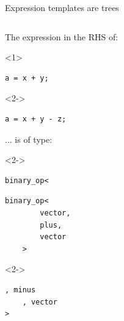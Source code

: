 \documentclass[@BEAMER_OPTIONS@]{beamer}
\begin{document}
\note{ }

\begin{frame}[fragile]{Expression templates are trees}
    \begin{columns}
        \begin{column}{0.4\textwidth}
            \begin{exampleblock}{The expression in the RHS of:}
                \begin{onlyenv}<1>
                    \begin{lstlisting}
a = x + y;
                    \end{lstlisting}
                \end{onlyenv}
                \begin{onlyenv}<2->
                    \begin{lstlisting}
a = x + y - z;
                    \end{lstlisting}
                \end{onlyenv}
            \end{exampleblock}
            \begin{exampleblock}{... is of type:}
                \begin{uncoverenv}<2->
                    \begin{lstlisting}[numbers=none]
binary_op<
                    \end{lstlisting}
                \end{uncoverenv}
                \begin{lstlisting}[numbers=none]
    binary_op<
        vector,
        plus,
        vector
    >
                \end{lstlisting}
                \begin{uncoverenv}<2->
                    \begin{lstlisting}[numbers=none]
    , minus
    , vector
>
                    \end{lstlisting}
                \end{uncoverenv}
            \end{exampleblock}
        \end{column}
        \begin{column}{0.55\textwidth}
            \begin{figure}
\end{figure}
\end{column}
\end{columns}
\end{frame}
\end{document}
